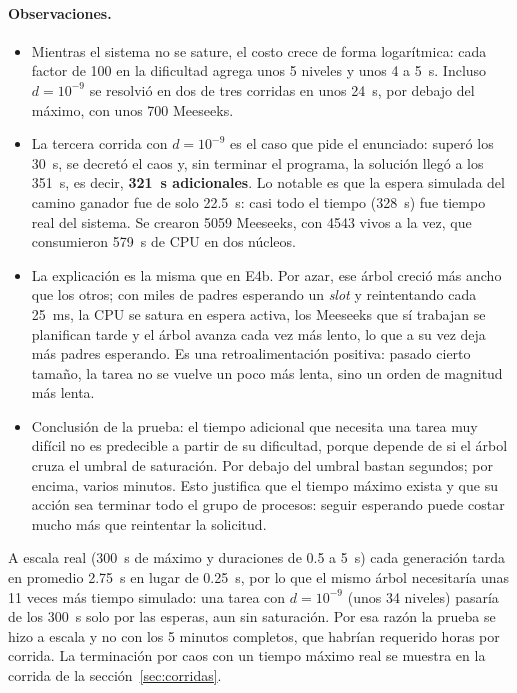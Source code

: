 \paragraph{Observaciones.}
\begin{itemize}[leftmargin=1.5em]
\item Mientras el sistema no se sature, el costo crece de forma logarítmica: cada factor de
  100 en la dificultad agrega unos 5 niveles y unos 4 a 5~s. Incluso $d=10^{-9}$ se resolvió
  en dos de tres corridas en unos 24~s, por debajo del máximo, con unos 700 Meeseeks.
\item La tercera corrida con $d=10^{-9}$ es el caso que pide el enunciado: superó los 30~s,
  se decretó el caos y, sin terminar el programa, la solución llegó a los 351~s, es decir,
  \textbf{321~s adicionales}. Lo notable es que la espera simulada del camino ganador fue de
  solo 22.5~s: casi todo el tiempo (328~s) fue tiempo real del sistema. Se crearon 5059
  Meeseeks, con 4543 vivos a la vez, que consumieron 579~s de CPU en dos núcleos.
\item La explicación es la misma que en E4b. Por azar, ese árbol creció más ancho que los
  otros; con miles de padres esperando un \emph{slot} y reintentando cada 25~ms, la CPU se
  satura en espera activa, los Meeseeks que sí trabajan se planifican tarde y el árbol
  avanza cada vez más lento, lo que a su vez deja más padres esperando. Es una
  retroalimentación positiva: pasado cierto tamaño, la tarea no se vuelve un poco más lenta,
  sino un orden de magnitud más lenta.
\item Conclusión de la prueba: el tiempo adicional que necesita una tarea muy difícil no es
  predecible a partir de su dificultad, porque depende de si el árbol cruza el umbral de
  saturación. Por debajo del umbral bastan segundos; por encima, varios minutos. Esto
  justifica que el tiempo máximo exista y que su acción sea terminar todo el grupo de
  procesos: seguir esperando puede costar mucho más que reintentar la solicitud.
\end{itemize}

A escala real (300~s de máximo y duraciones de 0.5 a 5~s) cada generación tarda en promedio
2.75~s en lugar de 0.25~s, por lo que el mismo árbol necesitaría unas 11 veces más tiempo
simulado: una tarea con $d=10^{-9}$ (unos 34 niveles) pasaría de los 300~s solo por las
esperas, aun sin saturación. Por esa razón la prueba se hizo a escala y no con los 5
minutos completos, que habrían requerido horas por corrida. La terminación por caos con un
tiempo máximo real se muestra en la corrida de la sección~\ref{sec:corridas}.
